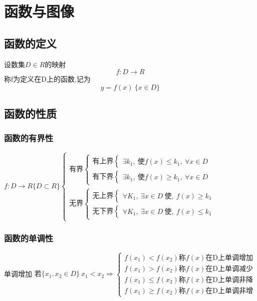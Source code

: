 \section{函数与图像}
\subsection{函数的定义}
设数集$D\in R$的映射
$$f: D\rightarrow R$$
称f为定义在D上的函数,记为
$$y = f(x)\ \{x\in D\}$$
 \subsection{函数的性质}
 \subsubsection{函数的有界性}
 $f:D\rightarrow R\{D\subset R\}$$\begin{cases}
    \mbox{有界}\begin{cases}
        \mbox{有上界}\begin{cases}
            \exists k_1,\ \mbox{使}f(x)\leqslant k_1,\ \forall x\in D  
        \end{cases}\\
        \mbox{有下界}\begin{cases}
            \exists k_1,\ \mbox{使}f(x)\geqslant  k_1,\ \forall x\in D  
        \end{cases}
    \end{cases}\\
    \mbox{无界}\begin{cases}
        \mbox{无上界}\begin{cases}
            \forall K_1,\ \exists x\in D\ \mbox{使},\ f(x)\geqslant  k_1
        \end{cases}\\
        \mbox{无下界}\begin{cases}
            \forall K_1,\ \exists x\in D\ \mbox{使},\ f(x)\leqslant  k_1
        \end{cases}
    \end{cases}
 \end{cases}$
 \subsubsection{函数的单调性}
 单调增加
 $\mbox{若}\{x_1,x_2\in D\}\ x_1<x_2\Rightarrow \begin{cases}
    f(x_1)<f(x_2)  \mbox{称}f(x)\mbox{在D上单调增加}\\
    f(x_1)>f(x_2)  \mbox{称}f(x)\mbox{在D上单调减少}\\
    f(x_1)\leqslant f(x_2)  \mbox{称}f(x)\mbox{在D上单调非降}\\
    f(x_1)\geqslant f(x_2)  \mbox{称}f(x)\mbox{在D上单调非增}
 \end{cases}$
